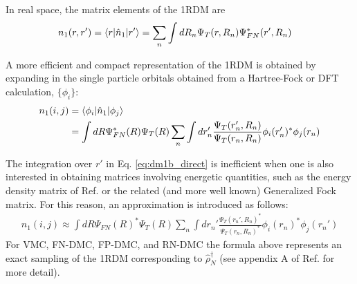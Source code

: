 In real space, the matrix elements of the 1RDM are
\begin{align}
  n_1(r,r') &= \expval{r}{\hat{n}_1}{r'} = \sum_n\int dR_n \Psi_T(r,R_n)\Psi_{FN}^*(r',R_n) 
\end{align}

A more efficient and compact representation of the 1RDM is obtained by expanding in the single particle orbitals obtained from a Hartree-Fock or DFT calculation, $\{\phi_i\}$:
\begin{align}\label{eq:dm1b_direct}
  n_1(i,j) &= \expval{\phi_i}{\hat{n}_1}{\phi_j} \nonumber \\
           &= \int dR \Psi_{FN}^*(R)\Psi_{T}(R) \sum_n\int dr'_n \frac{\Psi_T(r_n',R_n)}{\Psi_T(r_n,R_n)}\phi_i(r_n')^* \phi_j(r_n) 
\end{align} 

The integration over $r'$ in Eq. \ref{eq:dm1b_direct} is inefficient when one is also interested in obtaining matrices involving energetic quantities, such as the energy density matrix of Ref. \cite{Krogel2014} or the related (and more well known) Generalized Fock matrix.  For this reason, an approximation is introduced as follows:
\begin{align}
    n_1(i,j) \approx \int dR \Psi_{FN}(R)^*\Psi_T(R)  \sum_n \int dr_n' \frac{\Psi_T(r_n',R_n)^*}{\Psi_T(r_n,R_n)^*}\phi_i(r_n)^* \phi_j(r_n') 
\end{align}
For VMC, FN-DMC, FP-DMC, and RN-DMC the formula above represents an exact sampling of the 1RDM corresponding to $\hat{\rho}_N^\dagger$ (see appendix A of Ref. \cite{Krogel2014} for more detail).




